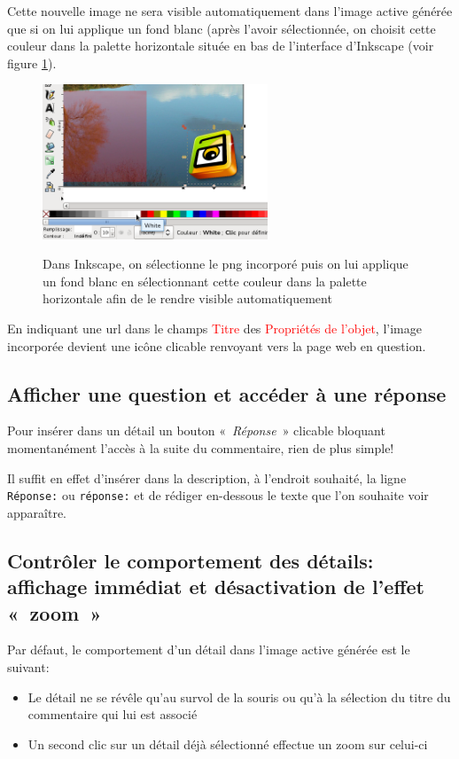 \documentclass[a4paper,12pt]{report}
\newcommand{\chemin}[1]{\textcolor{red}{#1}}
\begin{document}
Cette nouvelle image ne sera visible automatiquement dans l'image active générée
que si on lui applique un fond blanc (après l'avoir sélectionnée, on choisit cette couleur dans la palette
horizontale située en bas de l'interface d'Inkscape (voir figure \ref{remplissage_blanc}).

\begin{figure}[htp]
 \centering
 \caption{Dans Inkscape, on sélectionne le png incorporé puis on lui applique un fond blanc en sélectionnant 
 cette couleur dans la palette horizontale afin de le rendre visible automatiquement}
 \includegraphics[width=0.6\textwidth]{images/remplissage_blanc}
 \label{remplissage_blanc}
\end{figure}

En indiquant une url dans le champs \chemin{Titre} des \chemin{Propriétés de l'objet}, l'image incorporée
devient une icône clicable renvoyant vers la page web en question.

\subsection{Afficher une question et accéder à une réponse}

Pour insérer dans un détail un bouton «~\textit{Réponse}~» clicable bloquant momentanément l'accès à la suite du commentaire,
rien de plus simple!

Il suffit en effet d'insérer dans la description, à l'endroit souhaité, la ligne\\
\verb|Réponse:| ou \verb|réponse:| et de rédiger en-dessous le texte que l'on souhaite voir apparaître.

\subsection{Contrôler le comportement des détails: affichage immédiat et désactivation
de l'effet «~zoom~»}

Par défaut, le comportement d'un détail dans l'image active générée est le suivant:
\begin{itemize}
 \item Le détail ne se révêle qu'au survol de la souris ou qu'à la sélection du titre du commentaire
 qui lui est associé
 \item Un second clic sur un détail déjà sélectionné effectue un zoom sur celui-ci
\end{itemize}
\end{document}
